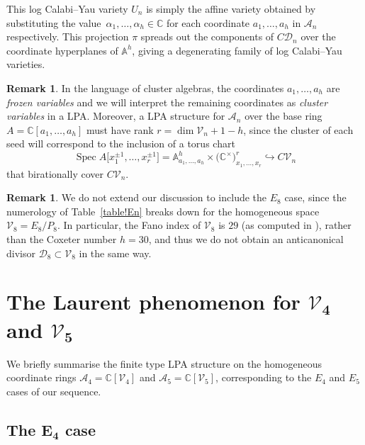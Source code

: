 \documentclass[pdftex]{sigma}
\numberwithin{equation}{section}
\theoremstyle{definition}
\newtheorem{rmk}[thm]{Remark}
\newcommand{\Aa}{\mathbb{A}}
\newcommand{\CC}{\mathbb{C}}
\DeclareMathOperator{\Spec}{Spec}
\begin{document}
This log Calabi--Yau variety $U_n$ is simply the affine variety obtained by substituting the value~${\alpha_1,\ldots,\alpha_h\in \CC}$ for each coordinate $a_1,\ldots,a_h$ in $\mathcal A_n$ respectively.
This projection $\pi$ spreads out the components of $C\mathcal D_n$ over the coordinate hyperplanes of $\Aa^h$, giving a degenerating family of log Calabi--Yau varieties.

\begin{rmk}\label{rmk!seed-rank}In the language of cluster algebras, the coordinates $a_1,\ldots,a_h$ are \emph{frozen variables} and we will interpret the remaining coordinates as \emph{cluster variables} in a LPA. Moreover, a LPA structure for $\mathcal A_n$ over the base ring $A=\CC[a_1,\ldots,a_h]$ must have rank $r = \dim \mathcal V_n + 1 - h$, since the cluster of each seed will correspond to the inclusion of a torus chart
\[ \Spec A\big[x_1^{\pm1},\ldots,x_r^{\pm1}\big] = \Aa^h_{a_1,\ldots,a_h}\times \big(\CC^\times\big)^r_{x_1,\ldots,x_r} \hookrightarrow C\mathcal V_n \]
that birationally cover $C\mathcal V_n$.
\end{rmk}

\begin{rmk}We do not extend our discussion to include the $E_8$ case, since the numerology of Table~\ref{table!En} breaks down for the homogeneous space $\mathcal V_8=E_8/P_8$. In particular, the Fano index of $\mathcal V_8$ is $29$ (as computed in \cite{snow}), rather than the Coxeter number $h=30$, and thus we do not obtain an anticanonical divisor $\mathcal D_8\subset \mathcal V_8$ in the same way.
\end{rmk}

\section[The Laurent phenomenon for V\_4 and V\_5]{The Laurent phenomenon for $\boldsymbol{\mathcal V_4}$ and $\boldsymbol{\mathcal V_5}$}
\label{section:warm-up-cases}

We briefly summarise the finite type LPA structure on the homogeneous coordinate rings ${\mathcal A_4 = \CC[\mathcal V_4]}$ and $\mathcal A_5 = \CC[\mathcal V_5]$, corresponding to the $E_4$ and $E_5$ cases of our sequence.

\subsection[The E\_4 case]{The $\boldsymbol{E_4}$ case}
\end{document}
